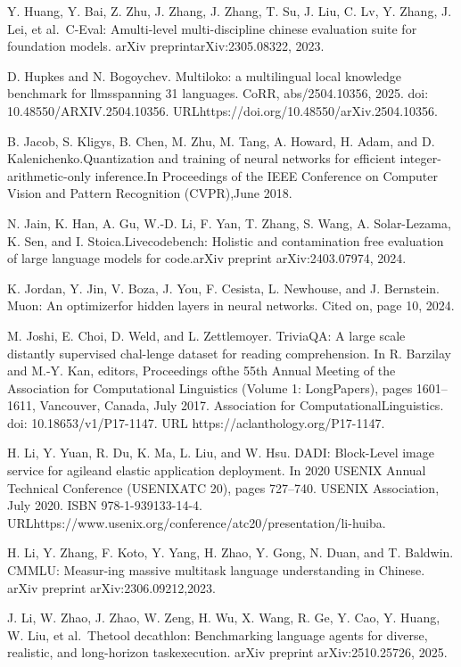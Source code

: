 \documentclass[
  10
]{article}
\begin{document}
Y. Huang, Y. Bai, Z. Zhu, J. Zhang, J. Zhang, T. Su, J. Liu, C. Lv, Y.
Zhang, J. Lei, et al.~C-Eval: Amulti-level multi-discipline chinese
evaluation suite for foundation models. arXiv preprintarXiv:2305.08322,
2023.

D. Hupkes and N. Bogoychev. Multiloko: a multilingual local knowledge
benchmark for llmsspanning 31 languages. CoRR, abs/2504.10356, 2025.
doi: 10.48550/ARXIV.2504.10356.
URLhttps://doi.org/10.48550/arXiv.2504.10356.

B. Jacob, S. Kligys, B. Chen, M. Zhu, M. Tang, A. Howard, H. Adam, and
D. Kalenichenko.Quantization and training of neural networks for
efficient integer-arithmetic-only inference.In Proceedings of the IEEE
Conference on Computer Vision and Pattern Recognition (CVPR),June 2018.

N. Jain, K. Han, A. Gu, W.-D. Li, F. Yan, T. Zhang, S. Wang, A.
Solar-Lezama, K. Sen, and I. Stoica.Livecodebench: Holistic and
contamination free evaluation of large language models for code.arXiv
preprint arXiv:2403.07974, 2024.

K. Jordan, Y. Jin, V. Boza, J. You, F. Cesista, L. Newhouse, and J.
Bernstein. Muon: An optimizerfor hidden layers in neural networks. Cited
on, page 10, 2024.

M. Joshi, E. Choi, D. Weld, and L. Zettlemoyer. TriviaQA: A large scale
distantly supervised chal-lenge dataset for reading comprehension. In R.
Barzilay and M.-Y. Kan, editors, Proceedings ofthe 55th Annual Meeting
of the Association for Computational Linguistics (Volume 1: LongPapers),
pages 1601--1611, Vancouver, Canada, July 2017. Association for
ComputationalLinguistics. doi: 10.18653/v1/P17-1147. URL
https://aclanthology.org/P17-1147.

H. Li, Y. Yuan, R. Du, K. Ma, L. Liu, and W. Hsu. DADI: Block-Level
image service for agileand elastic application deployment. In 2020
USENIX Annual Technical Conference (USENIXATC 20), pages 727--740.
USENIX Association, July 2020. ISBN 978-1-939133-14-4.
URLhttps://www.usenix.org/conference/atc20/presentation/li-huiba.

H. Li, Y. Zhang, F. Koto, Y. Yang, H. Zhao, Y. Gong, N. Duan, and T.
Baldwin. CMMLU: Measur-ing massive multitask language understanding in
Chinese. arXiv preprint arXiv:2306.09212,2023.

J. Li, W. Zhao, J. Zhao, W. Zeng, H. Wu, X. Wang, R. Ge, Y. Cao, Y.
Huang, W. Liu, et al.~Thetool decathlon: Benchmarking language agents
for diverse, realistic, and long-horizon taskexecution. arXiv preprint
arXiv:2510.25726, 2025.
\end{document}

